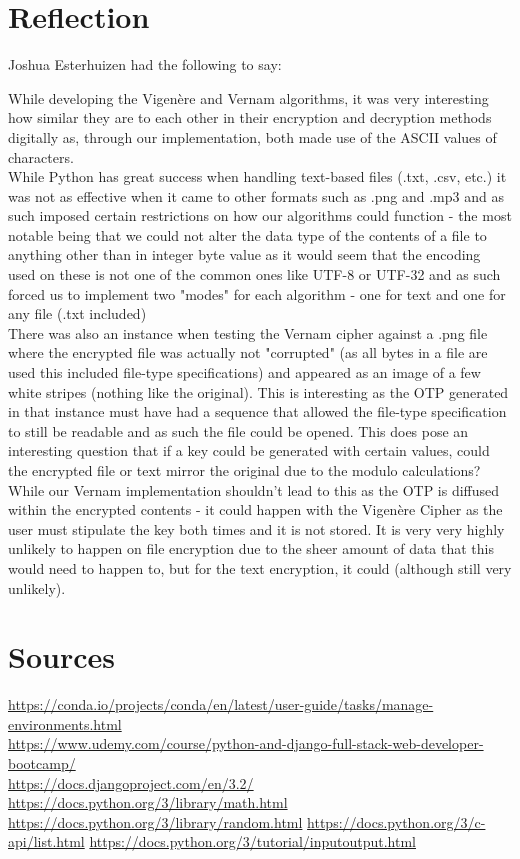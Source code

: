 \documentclass[a4paper, 12pt, titlepage]{report}
\begin{document}
\chapter{Reflection}
Joshua Esterhuizen had the following to say:
\begin{displayquote}
While developing the Vigenère and Vernam algorithms, it was very interesting how similar they are to each other in their encryption and decryption methods digitally as, through our implementation, both made use of the ASCII values of characters.
\\
While Python has great success when handling text-based files (.txt, .csv, etc.) it was not as effective when it came to other formats such as .png and .mp3 and as such imposed certain restrictions on how our algorithms could function - the most notable being that we could not alter the data type of the contents of a file to anything other than in integer byte value as it would seem that the encoding used on these is not one of the common ones like UTF-8 or UTF-32 and as such forced us to implement two "modes" for each algorithm - one for text and one for any file (.txt included)
\\
There was also an instance when testing the Vernam cipher against a .png file where the encrypted file was actually not "corrupted" (as all bytes in a file are used this included file-type specifications) and appeared as an image of a few white stripes (nothing like the original). This is interesting as the OTP generated in that instance must have had a sequence that allowed the file-type specification to still be readable and as such the file could be opened. This does pose an interesting question that if a key could be generated with certain values, could the encrypted file or text mirror the original due to the modulo calculations? While our Vernam implementation shouldn't lead to this as the OTP is diffused within the encrypted contents - it could happen with the Vigenère Cipher as the user must stipulate the key both times and it is not stored. It is very very highly unlikely to happen on file encryption due to the sheer amount of data that this would need to happen to, but for the text encryption, it could (although still very unlikely).
\end{displayquote}
\chapter{Sources}
\url{https://conda.io/projects/conda/en/latest/user-guide/tasks/manage-environments.html}\\
\url{https://www.udemy.com/course/python-and-django-full-stack-web-developer-bootcamp/}\\
\url{https://docs.djangoproject.com/en/3.2/}
\url{https://docs.python.org/3/library/math.html}
\url{https://docs.python.org/3/library/random.html}
\url{https://docs.python.org/3/c-api/list.html}
\url{https://docs.python.org/3/tutorial/inputoutput.html}
\end{document}

